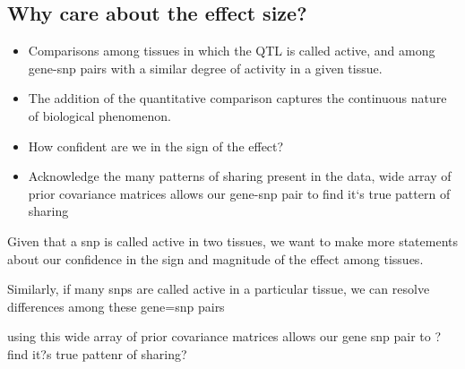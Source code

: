 \documentclass[10pt,letterpaper]{article}
\begin{document}
\subsection{Why care about the effect size?}

\begin{itemize}

\item Comparisons among tissues in which the QTL is called active, and among gene-snp pairs with a similar degree of activity in a given tissue. 
\item The addition of the quantitative comparison captures the continuous nature of biological phenomenon. %
\item How confident are we in the sign of the effect?
\item Acknowledge the many patterns of sharing present in the data, wide array of prior covariance matrices allows our gene-snp pair to find it`s true pattern of sharing


\end{itemize}

Given that a snp is called active in two tissues, we want to make more statements about our confidence in the sign and magnitude of the effect among tissues. 

Similarly, if many snps are called active  in a particular tissue, we can resolve differences among these gene=snp pairs 

using this wide array of prior covariance matrices allows our gene snp pair to ?find it?s true pattenr of sharing?
\end{document}
